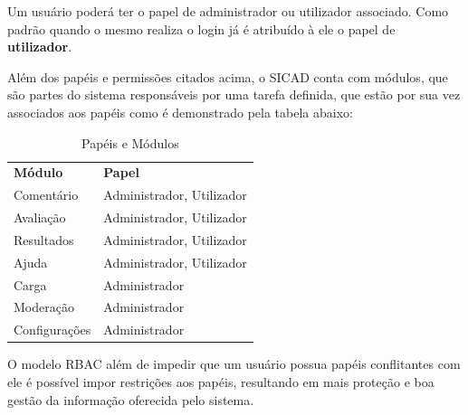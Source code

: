 \documentclass[12pt, a4paper]{report}
\begin{document}
Um usuário poderá ter o papel de administrador ou utilizador associado. Como padrão quando o mesmo realiza o login já é atribuído à ele o papel de \textbf{utilizador}.
\par Além dos papéis e permissões citados acima, o \ac{SICAD} conta com módulos, que são partes do sistema responsáveis por uma tarefa definida, que estão por sua vez associados aos papéis como é demonstrado pela tabela abaixo:
\begin{table}[h]
 \centering
 {\renewcommand\arraystretch{1.25}
 
 \begin{tabular}{ l l }
  \cline{1-1}\cline{2-2}  
    \multicolumn{1}{|p{3.850cm}|}{\textbf{Módulo} \centering } &
    \multicolumn{1}{p{7.217cm}|}{\textbf{Papel} \centering }
  \\  
  \cline{1-1}\cline{2-2}  
    \multicolumn{1}{|p{3.850cm}|}{Comentário} &
    \multicolumn{1}{p{6.217cm}|}{Administrador, Utilizador}
  \\  
  \cline{1-1}\cline{2-2}  
    \multicolumn{1}{|p{3.850cm}|}{Avaliação} &
    \multicolumn{1}{p{6.217cm}|}{Administrador, Utilizador}
  \\  
    \cline{1-1}\cline{2-2}  
    \multicolumn{1}{|p{3.850cm}|}{Resultados} &
    \multicolumn{1}{p{6.217cm}|}{Administrador, Utilizador}
  \\  
    \cline{1-1}\cline{2-2}  
    \multicolumn{1}{|p{3.850cm}|}{Ajuda} &
    \multicolumn{1}{p{6.217cm}|}{Administrador, Utilizador}
  \\  
    \cline{1-1}\cline{2-2}  
    \multicolumn{1}{|p{3.850cm}|}{Carga} &
    \multicolumn{1}{p{6.217cm}|}{Administrador}
  \\  
    \cline{1-1}\cline{2-2}  
    \multicolumn{1}{|p{3.850cm}|}{Moderação} &
    \multicolumn{1}{p{6.217cm}|}{Administrador}
  \\  
    \cline{1-1}\cline{2-2}  
    \multicolumn{1}{|p{3.850cm}|}{Configurações} &
    \multicolumn{1}{p{6.217cm}|}{Administrador}
  \\  
  \hline
 \end{tabular} }
 \caption{Papéis e Módulos}
\end{table}

O modelo RBAC além de impedir que um usuário possua papéis conflitantes com ele é possível impor restrições aos papéis, resultando em mais proteção e boa gestão da informação oferecida pelo sistema.
\end{document}

